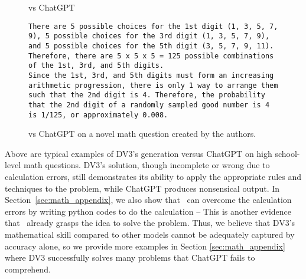 \begin{figure}[H]
\begin{AIbox}{\DV vs ChatGPT}
\begin{verbatim}
There are 5 possible choices for the 1st digit (1, 3, 5, 7, 9), 5 possible choices for the 3rd digit (1, 3, 5, 7, 9), and 5 possible choices for the 5th digit (3, 5, 7, 9, 11). Therefore, there are 5 x 5 x 5 = 125 possible combinations of the 1st, 3rd, and 5th digits.
Since the 1st, 3rd, and 5th digits must form an increasing arithmetic progression, there is only 1 way to arrange them such that the 2nd digit is 4. Therefore, the probability that the 2nd digit of a randomly sampled good number is 4 is 1/125, or approximately 0.008.
\end{verbatim}
\end{AIbox}
\caption{\DV vs ChatGPT on a novel math question created by the authors.}
\end{figure}







Above are typical examples of DV3's generation versus ChatGPT on high school-level math questions. DV3's solution, though incomplete or wrong due to calculation errors, still demonstrates its ability to apply the appropriate rules and techniques to the problem, while ChatGPT produces nonsensical output. In Section~\ref{sec:math_appendix}, we also show that \DV \ can overcome the calculation errors by writing python codes to do the calculation -- This is another evidence that \DV \ already grasps the idea to solve the problem. Thus, we believe that DV3's mathematical skill compared to other models cannot be adequately captured by accuracy alone, so we provide more examples in Section \ref{sec:math_appendix} where DV3 successfully solves many problems that ChatGPT fails to comprehend.

